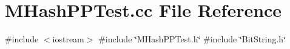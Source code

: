 \section{M\+Hash\+P\+P\+Test.\+cc File Reference}
\label{MHashPPTest_8cc}
{\ttfamily \#include $<$iostream$>$}\newline
{\ttfamily \#include \char`\"{}M\+Hash\+P\+P\+Test.\+h\char`\"{}}\newline
{\ttfamily \#include \char`\"{}Bit\+String.\+h\char`\"{}}\newline
